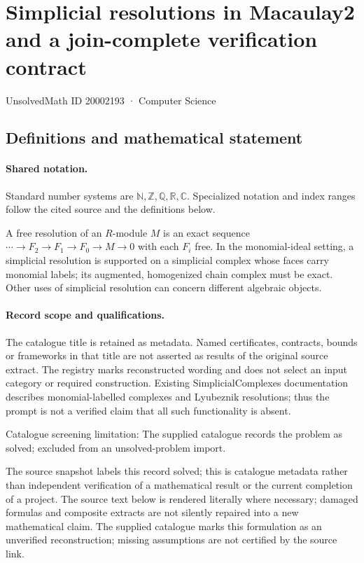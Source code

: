 \documentclass[11pt]{article}
\begin{document}
\setcounter{section}{20002192}
\section{Simplicial resolutions in Macaulay2 and a join-complete verification contract}\label{20002193}
{\small\sffamily UnsolvedMath ID 20002193 · Computer Science}
\subsection{Definitions and mathematical statement}

\paragraph{Shared notation.}Standard number systems are $\mathbb N,\mathbb Z,\mathbb Q,\mathbb R,\mathbb C$. Specialized notation and index ranges follow the cited source and the definitions below.


A free resolution of an $R$-module $M$ is an exact sequence $\cdots\to F_2\to F_1\to F_0\to M\to0$ with each $F_i$ free. In the monomial-ideal setting, a simplicial resolution is supported on a simplicial complex whose faces carry monomial labels; its augmented, homogenized chain complex must be exact. Other uses of simplicial resolution can concern different algebraic objects.
\paragraph{Record scope and qualifications.}
The catalogue title is retained as metadata. Named certificates, contracts, bounds or frameworks in that title are not asserted as results of the original source extract.
The registry marks reconstructed wording and does not select an input category or required construction. Existing SimplicialComplexes documentation describes monomial-labelled complexes and Lyubeznik resolutions; thus the prompt is not a verified claim that all such functionality is absent.

Catalogue screening limitation: The supplied catalogue records the problem as solved; excluded from an unsolved-problem import.

The source snapshot labels this record solved; this is catalogue metadata rather than independent verification of a mathematical result or the current completion of a project.
The source text below is rendered literally where necessary; damaged formulas and composite extracts are not silently repaired into a new mathematical claim.
The supplied catalogue marks this formulation as an unverified reconstruction; missing assumptions are not certified by the source link.
\end{document}
